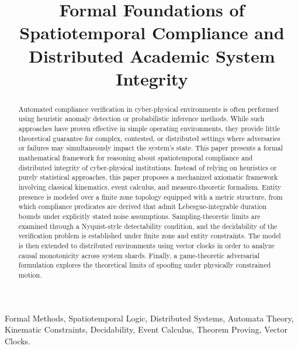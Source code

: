 \documentclass[conference]{IEEEtran}
\begin{document}
\title{Formal Foundations of Spatiotemporal Compliance and Distributed Academic System Integrity}

\author{
}

\maketitle

\begin{abstract}
Automated compliance verification in cyber-physical environments is often performed using heuristic anomaly detection or probabilistic inference methods. While such approaches have proven effective in simple operating environments, they provide little theoretical guarantee for complex, contested, or distributed settings where adversaries or failures may simultaneously impact the system’s state. This paper presents a formal mathematical framework for reasoning about spatiotemporal compliance and distributed integrity of cyber-physical institutions. Instead of relying on heuristics or purely statistical approaches, this paper proposes a mechanized axiomatic framework involving classical kinematics, event calculus, and measure-theoretic formalism. Entity presence is modeled over a finite zone topology equipped with a metric structure, from which compliance predicates are derived that admit Lebesgue-integrable duration bounds under explicitly stated noise assumptions. Sampling-theoretic limits are examined through a Nyquist-style detectability condition, and the decidability of the verification problem is established under finite zone and entity constraints. The model is then extended to distributed environments using vector clocks in order to analyze causal monotonicity across system shards. Finally, a game-theoretic adversarial formulation explores the theoretical limits of spoofing under physically constrained motion.
\end{abstract}

\begin{IEEEkeywords}
Formal Methods, Spatiotemporal Logic, Distributed Systems, Automata Theory, Kinematic Constraints, Decidability, Event Calculus, Theorem Proving, Vector Clocks.
\end{IEEEkeywords}
\end{document}
